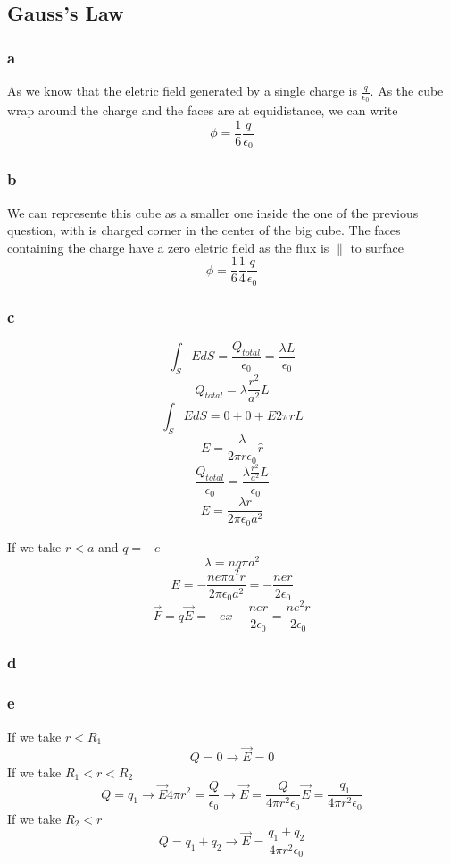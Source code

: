 \subsection{Gauss’s Law}

\subsubsection{a}
As we know that the eletric field generated by a single charge is
\(\frac{q}{\epsilon_0}\). As the cube wrap around the charge and the faces
are at equidistance, we can write
\[
	\phi = \frac{1}{6} \frac{q}{\epsilon_0}
\]

\subsubsection{b}
We can represente this cube as a smaller one inside the one of the previous
question, with is charged corner in the center of the big cube. The faces
containing the charge have a zero eletric field as the flux is \(\parallel\) to
surface
\[
	\phi = \frac{1}{6} \frac{1}{4} \frac{q}{\epsilon_0}
\]

\subsubsection{c}
\[
	\int_S E dS = \frac{Q_{total}}{\epsilon_0} = \frac{\lambda L}{\epsilon_0}
\]
\[
	Q_{total} = \lambda \frac{r^2}{a^2} L
\]
\[
	\int_S E dS = 0 + 0 + E 2 \pi r L
\]
\[
	E = \frac{\lambda}{2 \pi r \epsilon_0} \hat{r}
\]
\[
	\frac{Q_{total}}{\epsilon_0}
	= \frac{\lambda \frac{r^2}{a^2} L}{\epsilon_0}
\]
\[
	E = \frac{\lambda r}{2 \pi \epsilon_0 a^2}
\]

If we take \(r < a\) and \(q = -e\)
\[
	\lambda = n q \pi a^2
\]
\[
	E = - \frac{n e \pi a^2 r}{2 \pi \epsilon_0 a^2}
	= - \frac{n e r}{2 \epsilon_0}
\]
\[
	\vec{F} = q \vec{E} = - e x - \frac{n e r}{2 \epsilon_0}
	= \frac{n e^2 r}{2 \epsilon_0}
\]

\subsubsection{d}

\subsubsection{e}
If we take \(r < R_1\)
\[
	Q = 0 \to \vec{E} = 0
\]
If we take \(R_1 < r < R_2\)
\[
	Q = q_1 \to
	\vec{E} 4 \pi r^2 = \frac{Q}{\epsilon_0} \to
	\vec{E} = \frac{Q}{4 \pi r^2 \epsilon_0}
	\vec{E} = \frac{q_1}{4 \pi r^2 \epsilon_0}
\]
If we take \(R_2 < r\)
\[
	Q = q_1 + q_2 \to
	\vec{E} = \frac{q_1 + q_2}{4 \pi r^2 \epsilon_0}
\]

